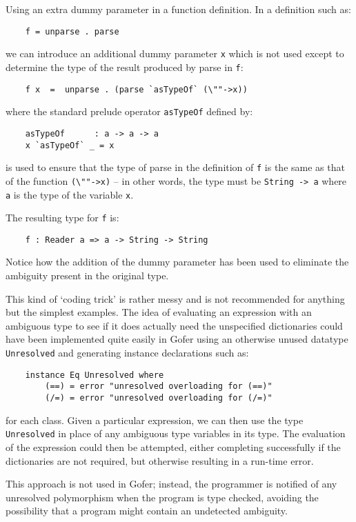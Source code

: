 \IT  Using an extra dummy parameter in a  function  definition.   In  a
     definition such as:
\begin{verbatim}
    f = unparse . parse
\end{verbatim}
     we can introduce an additional dummy parameter \verb"x"  which  is  not
     used except to determine the type of the result produced by  parse
     in \verb"f":
\begin{verbatim}
    f x  =  unparse . (parse `asTypeOf` (\""->x))
\end{verbatim}
     where the standard prelude operator \verb"asTypeOf" defined by:
\begin{verbatim}
    asTypeOf      : a -> a -> a
    x `asTypeOf` _ = x
\end{verbatim}
     is used to ensure that the type of parse in the definition of \verb"f" is
     the same as that of the function \verb'(\""->x)' -- in other  words,  the
     type must be \verb"String -> a" where 
     \verb"a" is the type of the variable \verb"x".

     The resulting type for \verb"f" is:
\begin{verbatim}
    f : Reader a => a -> String -> String
\end{verbatim}
     Notice how the addition of the dummy parameter has  been  used  to
     eliminate the ambiguity present in the original type.

     This kind of `coding trick' is rather messy and is not recommended
     for anything but the simplest examples.
\EI
The idea of evaluating an expression with an ambiguous type  to
see if it does actually need the unspecified  dictionaries  could  have
been implemented quite easily in Gofer using an otherwise unused
datatype \verb"Unresolved" and generating instance declarations such as:
\begin{verbatim}
    instance Eq Unresolved where
        (==) = error "unresolved overloading for (==)"
        (/=) = error "unresolved overloading for (/=)"
\end{verbatim}
for each class.  Given a particular expression, we  can  then  use  the
type \verb"Unresolved" 
in place of any ambiguous type variables in its type.   The
evaluation of the expression could then be attempted, either completing
successfully if  the  dictionaries  are  not  required,  but  otherwise
resulting in a run-time error.

This approach is not used in Gofer; instead, the programmer is notified
of any unresolved  polymorphism  when  the  program  is  type  checked,
avoiding the possibility that a program  might  contain  an  undetected
ambiguity.


